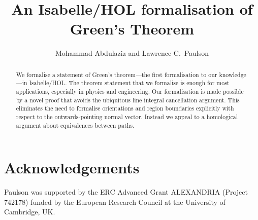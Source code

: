 \documentclass[11pt,a4paper]{article}
\begin{document}
\title{An Isabelle/HOL formalisation of Green's Theorem}
\author{Mohammad Abdulaziz and Lawrence C.\ Paulson}
\maketitle

\begin{abstract}
  We formalise a statement of Green’s theorem---the first formalisation to
  our knowledge---in Isabelle/HOL. The theorem statement that we formalise
  is enough for most applications, especially in physics and
  engineering. Our formalisation is made possible by a novel proof that
  avoids the ubiquitous line integral cancellation argument. This
  eliminates the need to formalise orientations and region boundaries
  explicitly with respect to the outwards-pointing normal vector.
  Instead we appeal to a homological argument about equivalences between
  paths.
\end{abstract}


\section{Acknowledgements}
Paulson was supported by the ERC Advanced Grant ALEXANDRIA (Project 742178) funded by the European Research Council
at the University of Cambridge, UK.





\end{document}
